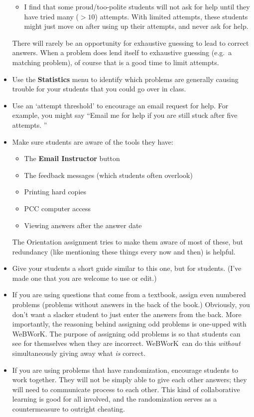 \documentclass[12pt]{article}
\newcommand{\menu}[1]{\textbf{#1}}
\newcommand{\WW}{WeBWorK}
\begin{document}
\begin{itemize}
\begin{itemize}
		      \item I find that some proud/too-polite students will not ask for help until they have tried many ($>\!\!10$) attempts.
		            With limited attempts, these students might just move on after using up their attempts, and never ask for help.

	      \end{itemize}

	      There will rarely be an opportunity for exhaustive guessing to lead to correct answers.
	      When a problem does lend itself to exhaustive guessing (e.g.\ a matching problem), of course that is a good time to limit attempts.

	\item Use the \menu{Statistics} menu to identify which problems are generally causing trouble for your students that you could go over in class.

	\item Use an `attempt threshold' to encourage an email request for help.
	      For example, you might say ``Email me for help if you are still stuck after five attempts.
	      ''

	\item Make sure students are aware of the tools they have:
	      \begin{itemize}
		      \item The \menu{Email Instructor} button
		      \item The feedback messages (which students often overlook)
		      \item Printing hard copies
		      \item PCC computer access
		      \item Viewing answers after the answer date
	      \end{itemize}
	      The Orientation assignment tries to make them aware of most of these, but redundancy (like mentioning these things every now and then) is helpful.

	\item Give your students a short guide similar to this one, but for students.  (I've made one that you are welcome to use or edit.)

	\item If you are using questions that come from a textbook, assign even numbered problems (problems without answers in the back of the book.)  Obviously, you don't want a slacker student to just enter the answers from the back.
	      More importantly, the reasoning behind assigning odd problems is one-upped with \WW.
	      The purpose of assigning odd problems is so that students can see for themselves when they are incorrect.
	      \WW\ can do this \emph{without} simultaneously giving away what \emph{is} correct.

	\item If you are using problems that have randomization, encourage students to work together.
	      They will not be simply able to give each other answers; they will need to communicate process to each other.
	      This kind of collaborative learning is good for all involved, and the randomization serves as a countermeasure to outright cheating.

\end{itemize}
\end{document}
